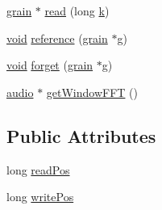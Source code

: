 \begin{DoxyCompactItemize}
\item 
\hyperlink{class__sbsms___1_1grain}{grain} $\ast$ \hyperlink{class__sbsms___1_1_grain_buf_a7b9c98164fe0e557f6219541ed8bf9b9}{read} (long \hyperlink{rfft2d_test_m_l_8m_adc468c70fb574ebd07287b38d0d0676d}{k})
\item 
\hyperlink{sound_8c_ae35f5844602719cf66324f4de2a658b3}{void} \hyperlink{class__sbsms___1_1_grain_buf_aa13b3bd58f3a6aff6d2c3a8b80246cb8}{reference} (\hyperlink{class__sbsms___1_1grain}{grain} $\ast$g)
\item 
\hyperlink{sound_8c_ae35f5844602719cf66324f4de2a658b3}{void} \hyperlink{class__sbsms___1_1_grain_buf_a09bdbfe3c3992c822847b5f791ece72e}{forget} (\hyperlink{class__sbsms___1_1grain}{grain} $\ast$g)
\item 
\hyperlink{namespace__sbsms___a11786cc5bd221ff534972ae350477324}{audio} $\ast$ \hyperlink{class__sbsms___1_1_grain_buf_a1388f01e03da23b4155955e009bb1c35}{get\+Window\+F\+FT} ()
\end{DoxyCompactItemize}
\subsection*{Public Attributes}
\begin{DoxyCompactItemize}
\item 
long \hyperlink{class__sbsms___1_1_grain_buf_ac915918e02c0a57058a5948ada38b112}{read\+Pos}
\item 
long \hyperlink{class__sbsms___1_1_grain_buf_aee3dd2e07861651ec28e3f09dc697fdb}{write\+Pos}
\end{DoxyCompactItemize}
